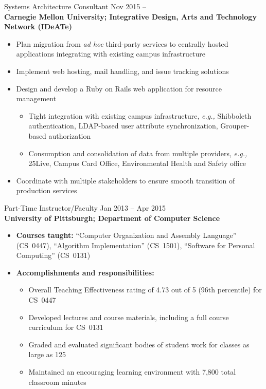 \documentclass[11pt]{article}
\newcommand{\textdb}[1]{\fontseries{db}\selectfont#1\normalfont}
\newcommand{\present}{\phantom{Xxx 20XX}}
\begin{document}
\textdb{
Systems Architecture Consultant
	\hfill Nov 2015 -- \present \\
}
\textbf{Carnegie Mellon University; Integrative Design, Arts and Technology Network (IDeATe)}
\begin{itemize}
	\item Plan migration from \emph{ad hoc} third-party services
		to centrally hosted applications
		integrating with existing campus infrastructure
	\item Implement web hosting, mail handling, and issue tracking solutions
	\item Design and develop a Ruby on Rails web application for resource management
		\begin{itemize}
			\item Tight integration with existing campus infrastructure, \emph{e.g.,}
				Shibboleth authentication,
				LDAP-based user attribute synchronization,
				Grouper-based authorization
			\item Consumption and consolidation of data from multiple providers, \emph{e.g.,}
				25Live,
				Campus Card Office,
				Environmental Health and Safety office
		\end{itemize}
	\item Coordinate with multiple stakeholders
		to ensure smooth transition of production services
\end{itemize}

\textdb{
Part-Time Instructor/Faculty
	\hfill Jan 2013 -- Apr 2015 \\
}
\textbf{University of Pittsburgh; Department of Computer Science}
\begin{itemize}
	\item \textbf{Courses taught:}
		``Computer Organization and Assembly Language'' (CS~0447),
		``Algorithm Implementation'' (CS~1501),
		``Software for Personal Computing'' (CS~0131)
	\item \textbf{Accomplishments and responsibilities:}
		\begin{itemize}
			\item Overall Teaching Effectiveness rating of 4.73 out of 5
				(96th percentile) for CS~0447
			\item Developed lectures and course materials,
				including a full course curriculum for CS~0131
			\item Graded and evaluated significant bodies of student work
				for classes as large as 125
			\item Maintained an encouraging learning environment
				with 7,800 total classroom minutes
		\end{itemize}
\end{itemize}
\end{document}
